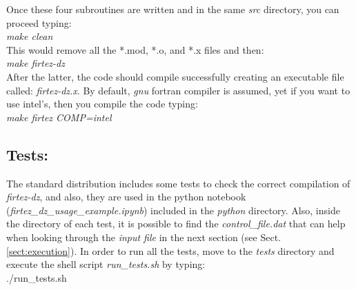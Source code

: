 Once these four subroutines are written and in the same {\it src} directory, you can proceed typing:\\
{\it make clean}\\
This would remove all the *.mod, *.o, and *.x files and then:\\
{\it make firtez-dz}\\
After the latter, the code should compile successfully creating an executable file called: {\it firtez-dz.x}. By default, {\it gnu} fortran compiler is assumed, yet if you want to use intel's, then you compile the code typing:\\
{\it make firtez COMP=intel}\\

%
%
\subsection{Tests:}
The standard distribution includes some tests to check the correct compilation of {\it firtez-dz}, and also, they are used in the python notebook ({\it firtez\_dz\_usage\_example.ipynb}) included in the {\it python} directory. Also, inside the directory of each test, it is possible to find the {\it control\_file.dat} that can help when looking through the {\it input file} in the next section (see Sect. \ref{sect:execution}). In order to run all the tests, move to the {\it tests} directory and execute the shell script {\it run\_tests.sh} by typing:\\

./run\_tests.sh

%